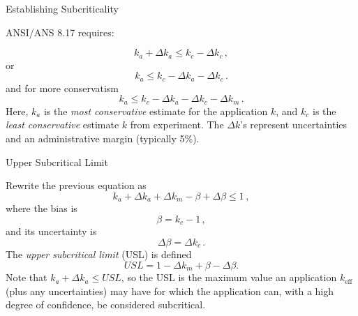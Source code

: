 \documentclass[10pt]{beamer}
\newcommand{\keff}{$k_{\text{eff}}$ }
\begin{document}
\begin{frame}{Establishing Subcriticality}

ANSI/ANS 8.17 requires:

\begin{equation}
 k_a + \Delta k_a \leq k_c - \Delta k_c \, ,
\end{equation}
or
\begin{equation}
 k_a \leq k_c  - \Delta k_a - \Delta k_c \, .
\end{equation}
and for more conservatism
\begin{equation}
 k_a \leq k_c - \Delta k_a - \Delta k_c - \Delta k_m \, .
\end{equation}
Here, $k_a$ is the {\it most conservative} estimate for the application $k$,
and $k_c$ is the {\it least conservative} estimate $k$ from experiment.  
The $\Delta k$'s represent uncertainties and an administrative margin 
(typically 5\%).

\end{frame}

\begin{frame}{Upper Subcritical Limit}

Rewrite the previous equation as
\begin{equation}
 k_a + \Delta k_a + \Delta k_m - \beta + \Delta \beta \leq 1 \, ,
\label{eq:kallow}
\end{equation}
where the bias is
\begin{equation}
 \beta = k_c - 1 \, ,
\end{equation}
and its uncertainty is
\begin{equation}
 \Delta \beta = \Delta k_c \, .
\end{equation}
\vfill
The {\it upper subcritical limit} (USL) is defined
\begin{equation}
 USL = 1 - \Delta k_m + \beta - \Delta \beta  .
\end{equation}
Note that $k_a + \Delta k_a \leq USL$, so the USL \textcolor{mitred}
{is the maximum value an 
application \keff (plus any uncertainties) may have for which the 
application can, with a high degree of confidence, be considered 
subcritical.}

\end{frame}
\end{document}
